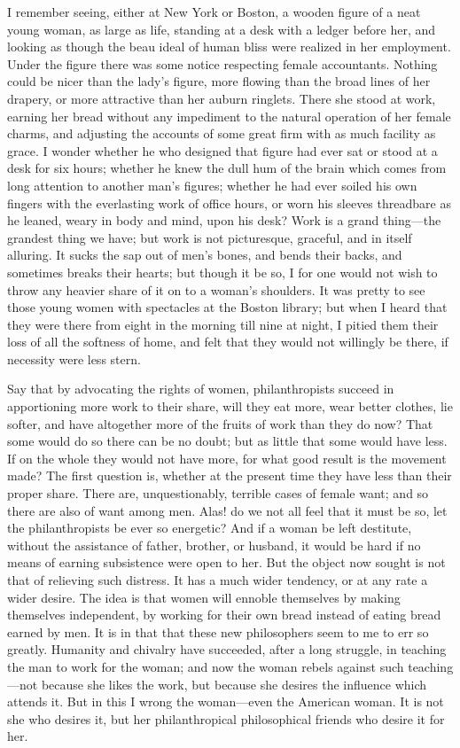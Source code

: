 I remember seeing, either at New York or Boston, a wooden figure of
a neat young woman, as large as life, standing at a desk with a
ledger before her, and looking as though the beau ideal of human
bliss were realized in her employment.  Under the figure there was
some notice respecting female accountants.  Nothing could be nicer
than the lady's figure, more flowing than the broad lines of her
drapery, or more attractive than her auburn ringlets.  There she
stood at work, earning her bread without any impediment to the
natural operation of her female charms, and adjusting the accounts
of some great firm with as much facility as grace.  I wonder
whether he who designed that figure had ever sat or stood at a desk
for six hours; whether he knew the dull hum of the brain which
comes from long attention to another man's figures; whether he had
ever soiled his own fingers with the everlasting work of office
hours, or worn his sleeves threadbare as he leaned, weary in body
and mind, upon his desk?  Work is a grand thing---the grandest thing
we have; but work is not picturesque, graceful, and in itself
alluring.  It sucks the sap out of men's bones, and bends their
backs, and sometimes breaks their hearts; but though it be so, I
for one would not wish to throw any heavier share of it on to a
woman's shoulders.  It was pretty to see those young women with
spectacles at the Boston library; but when I heard that they were
there from eight in the morning till nine at night, I pitied them
their loss of all the softness of home, and felt that they would
not willingly be there, if necessity were less stern.

Say that by advocating the rights of women, philanthropists succeed
in apportioning more work to their share, will they eat more, wear
better clothes, lie softer, and have altogether more of the fruits
of work than they do now?  That some would do so there can be no
doubt; but as little that some would have less.  If on the whole
they would not have more, for what good result is the movement
made?  The first question is, whether at the present time they have
less than their proper share.  There are, unquestionably, terrible
cases of female want; and so there are also of want among men.
Alas! do we not all feel that it must be so, let the
philanthropists be ever so energetic?  And if a woman be left
destitute, without the assistance of father, brother, or husband,
it would be hard if no means of earning subsistence were open to
her.  But the object now sought is not that of relieving such
distress.  It has a much wider tendency, or at any rate a wider
desire.  The idea is that women will ennoble themselves by making
themselves independent, by working for their own bread instead of
eating bread earned by men.  It is in that that these new
philosophers seem to me to err so greatly.  Humanity and chivalry
have succeeded, after a long struggle, in teaching the man to work
for the woman; and now the woman rebels against such teaching---not
because she likes the work, but because she desires the influence
which attends it.  But in this I wrong the woman---even the American
woman.  It is not she who desires it, but her philanthropical
philosophical friends who desire it for her.

